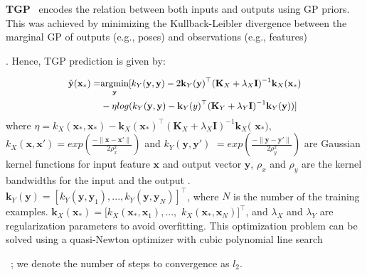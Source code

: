 \textbf{TGP}~\cite{Bo:2010} encodes the relation between both inputs and outputs using GP priors. This was achieved by minimizing the Kullback-Leibler divergence between the marginal GP of outputs (e.g., poses) and observations (e.g., features). Hence,  TGP prediction is given by:
\begin{equation}
\small
\begin{split}
\hat{\textbf{y}}(\textbf{x}_*) =  &\underset{\textbf{y}}{\operatorname{argmin       }}[  k_Y(\textbf{y},\textbf{y})  -2 \textbf{k}_Y(\textbf{y})^\top (\textbf{K}_X + \lambda_X  \textbf{I})^{-1} \textbf{k}_X(\textbf{x}_*) \\&- \eta  log (k_Y(\textbf{y},\textbf{y})  -\textbf{k}_Y(y)^\top ({\textbf{K}_Y}+ \lambda_Y \textbf{I})^{-1} {\textbf{k}_Y(\textbf{y})} ) ]
\end{split}
\label{eq:tgp}
\vspace{-5mm}
\end{equation}
where $\eta  = k_X(\textbf{x}_*,\textbf{x}_*) -\textbf{k}_X(\textbf{x}_*)^\top  (\textbf{K}_X + \lambda_X  \textbf{I})^{-1} \textbf{k}_X($ $\textbf{x}_*)$, $k_X(\textbf{x},\textbf{x}') = exp(\frac{- \|\textbf{x}-\textbf{x}' \|}{2 \rho_x^2})$ and $k_Y(\textbf{y},\textbf{y}')$ $= exp(\frac{- \|\textbf{y}-\textbf{y}' \|}{2 \rho_y^2})$ are Gaussian kernel functions for input feature $\textbf{x}$ and output vector $\textbf{y}$, $\rho_x$ and $\rho_y$ are the kernel bandwidths for the input and the output  . $\textbf{k}_Y(\textbf{y}) = [k_Y(\textbf{y},\textbf{y}_1), ..., k_Y(\textbf{y},\textbf{y}_{N})]^\top$, where $N$ is the number of the training examples. $\textbf{k}_X(\textbf{x}_*) = [k_X(\textbf{x}_*,\textbf{x}_1), ...,$ ${k}_X(\textbf{x}_*,\textbf{x}_{N})]^\top$, and $\lambda_X$ and $\lambda_Y$ are regularization parameters to avoid overfitting. This optimization problem can be solved using a quasi-Newton optimizer with cubic polynomial line search ~\cite{Bo:2010}; we denote the number of steps to convergence as $l_2$.




